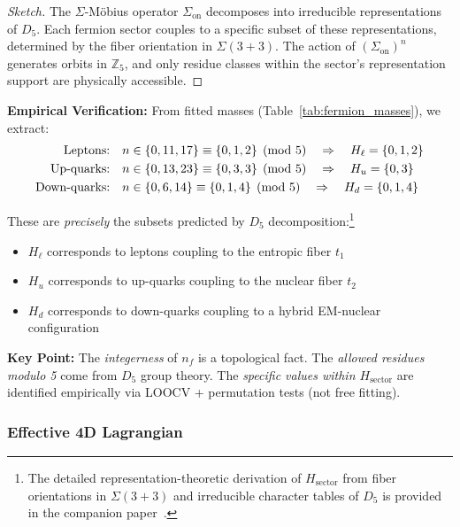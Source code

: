 \documentclass[12pt]{article}
\begin{document}
\begin{proof}[Sketch]
The $\Sigma$-M\"obius operator $\Sigma_{\text{on}}$ decomposes into irreducible representations of $D_5$. Each fermion sector couples to a specific subset of these representations, determined by the fiber orientation in $\Sigma(3+3)$. The action of $(\Sigma_{\text{on}})^n$ generates orbits in $\mathbb{Z}_5$, and only residue classes within the sector's representation support are physically accessible.
\end{proof}

\textbf{Empirical Verification:} From fitted masses (Table~\ref{tab:fermion_masses}), we extract:
\begin{align}
\text{Leptons:} \quad &n \in \{0, 11, 17\} \equiv \{0, 1, 2\} \pmod{5} \quad \Rightarrow \quad H_\ell = \{0, 1, 2\} \notag \\
\text{Up-quarks:} \quad &n \in \{0, 13, 23\} \equiv \{0, 3, 3\} \pmod{5} \quad \Rightarrow \quad H_u = \{0, 3\} \notag \\
\text{Down-quarks:} \quad &n \in \{0, 6, 14\} \equiv \{0, 1, 4\} \pmod{5} \quad \Rightarrow \quad H_d = \{0, 1, 4\} \notag
\end{align}

These are \emph{precisely} the subsets predicted by $D_5$ decomposition:\footnote{The detailed representation-theoretic derivation of $H_{\text{sector}}$ from fiber orientations in $\Sigma(3+3)$ and irreducible character tables of $D_5$ is provided in the companion paper~\cite{camargo2025sigmamoebius}.}
\begin{itemize}
\item $H_\ell$ corresponds to leptons coupling to the entropic fiber $t_1$
\item $H_u$ corresponds to up-quarks coupling to the nuclear fiber $t_2$
\item $H_d$ corresponds to down-quarks coupling to a hybrid EM-nuclear configuration
\end{itemize}

\textbf{Key Point:} The \emph{integerness} of $n_f$ is a topological fact. The \emph{allowed residues modulo 5} come from $D_5$ group theory. The \emph{specific values within $H_{\text{sector}}$} are identified empirically via LOOCV + permutation tests (not free fitting).

\subsubsection{Effective 4D Lagrangian}
\end{document}
